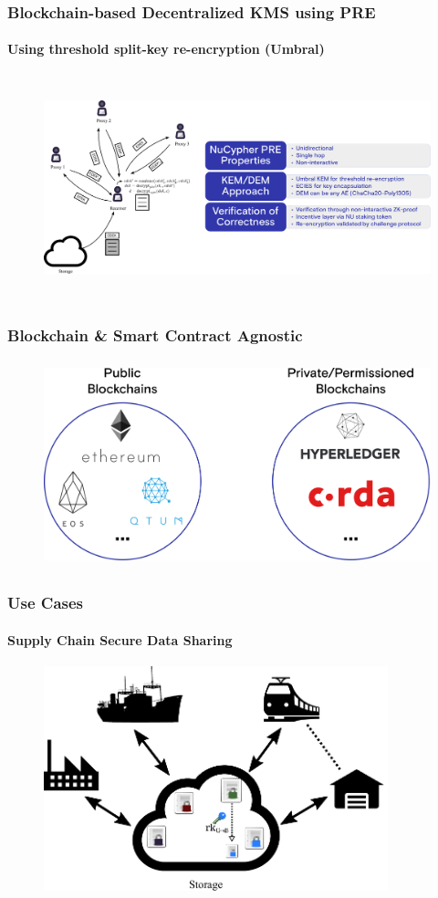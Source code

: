 \documentclass[xetex,mathsans,sans,aspectratio=169]{beamer}
\begin{document}
    \begin{frame}
        \frametitle{Blockchain-based Decentralized KMS using PRE}
        \framesubtitle{Using threshold split-key re-encryption (Umbral)}
        \begin{figure}
            \centering
            \includegraphics[height=6.5cm]{pdf/decrypt-umbral-with-note.pdf}
        \end{figure}
    \end{frame}

    \begin{frame}
        \frametitle{Blockchain \& Smart Contract Agnostic}
        \begin{figure}
            \centering
            \includegraphics[height=6cm]{pdf/blockchains.pdf}
        \end{figure}
    \end{frame}

    \begin{frame}
        \frametitle{Use Cases}
        \framesubtitle{Supply Chain Secure Data Sharing}
        \begin{figure}
            \centering
            \includegraphics[height=6.5cm]{pdf/supply-chain.pdf}
        \end{figure}
    \end{frame}
\end{document}
